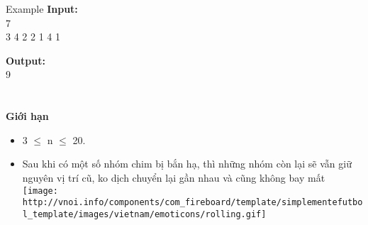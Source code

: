 Example
\textbf{Input:}
\\7
\\3 4 2 2 1 4 1

\textbf{Output:}
\\9
\\
\\
\\\textbf{Giới hạn}
\begin{itemize}
	\item 3  $\le$  n  $\le$  20.
	\item Sau khi có một số nhóm chim bị bắn hạ, thì những nhóm còn lại sẽ vẫn giữ nguyên vị trí cũ, ko dịch chuyển lại gần nhau và cũng không bay mất 
\texttt{[image: http://vnoi.info/components/com\_fireboard/template/simplementefutbol\_template/images/vietnam/emoticons/rolling.gif]}
\end{itemize}